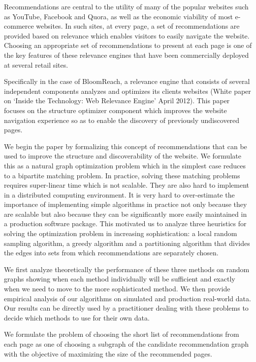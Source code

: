 \abstract

Recommendations are central to the utility of many of the popular websites such as YouTube, 
Facebook and Quora, as well as the economic viability of most e-commerce websites. 
In such sites, at every page, a set of recommendations are provided based on relevance
which enables visitors to easily navigate the website. Choosing an appropriate set of recommendations to 
present at each page is one of the key features of these relevance engines that have been 
commercially deployed at several retail sites.

Specifically in the case of BloomReach, a relevance engine that consists of several independent 
components analyzes and optimizes its clients websites (White paper on `Inside the Technology: 
Web Relevance Engine' April 2012). This paper focuses on the structure optimizer component which
improves the website navigation experience so as to enable the discovery of previously 
undiscovered pages. 

We begin the paper by formalizing this concept of recommendations that can be used to improve
the structure and discoverability of the website. We formulate this as a natural graph optimization 
problem which in the simplest case reduces to a bipartite matching problem. In practice, solving these 
matching problems requires super-linear time which is not scalable. They are also hard to implement in a 
distributed computing environment. It is very hard to over-estimate the importance of implementing simple 
algorithms in practice not only because they are scalable but also because they can be significantly
more easily maintained in a production software package. This motivated us to analyze three heuristics
for solving the optimization problem in increasing sophistication: a local random sampling algorithm, 
a greedy algorithm and a partitioning algorithm that divides the edges into sets from which recommendations 
are separately chosen.

We first analyze theoretically the performance of these three methods on random graphs showing when 
each method individually will be sufficient and exactly when we need to move to the more sophisticated method. 
We then provide empirical analysis of our algorithms on simulated and production real-world data. 
Our results can be directly used by a practitioner dealing with these problems to decide which methods to use
for their own data.

\iffalse 

We formulate the problem of choosing the short list of recommendations from each page as one of choosing a subgraph of the candidate recommendation graph with the objective of maximizing the size of the recommended pages.

